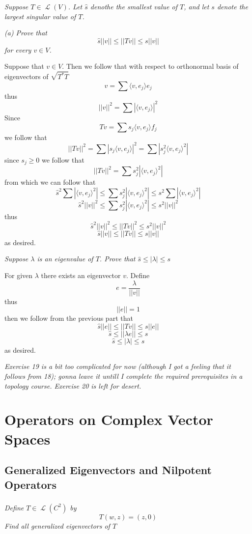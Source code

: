 \documentclass[11pt,oneside,titlepage]{book}
\DeclareMathOperator \map {\mathcal {L}}
\newcommand{\eangle}[1]{\langle #1 \rangle}
\begin{document}
\textit{Suppose $T \in \map(V)$. Let $\hat{s}$ denothe the smallest value of $T$, and let $s$
  denote the largest singular value of $T$.}

\textit{(a) Prove that
  $$\hat{s}||v|| \leq ||Tv|| \leq s||v||$$
  for every $v \in V$.}

Suppose that $v \in V$. Then we follow that with respect to orthonormal basis of eigenvectors
of $\sqrt{T^* T}$
$$v = \sum{\eangle{v, e_j} e_j}$$
thus
$$||v||^2 = \sum{|\eangle{v, e_j}|^2}$$
Since
$$Tv = \sum{s_j \eangle{v, e_j} f_j}$$
we follow that
$$||Tv||^2 = \sum{|s_j \eangle{v, e_j}|^2} = \sum{|s_j^2 \eangle{v, e_j}^2|}$$
since $s_j \geq 0$ we follow that
$$||Tv||^2 = \sum{s_j^2|\eangle{v, e_j}^2|}$$
from which we can follow that
$$\hat{s}^2\sum{|\eangle{v, e_j}^2|} \leq \sum{s_j^2|\eangle{v, e_j}^2|}
\leq s^2 \sum{|\eangle{v, e_j}^2|}$$
$$\hat{s}^2||v||^2 \leq \sum{s_j^2|\eangle{v, e_j}^2|}
\leq s^2 ||v||^2$$
thus
$$\hat{s}^2||v||^2 \leq ||Tv||^2 \leq s^2 ||v||^2$$
$$\hat{s}||v|| \leq ||Tv|| \leq s ||v||$$
as desired.

\textit{Suppose $\lambda$ is an eigenvalue of $T$. Prove that $\hat{s} \leq |\lambda| \leq s$}

For given $\lambda$ there exists an eigenvector $v$. Define
$$e = \frac{\lambda}{||v||}$$
thus
$$||e|| = 1$$
then we follow from the previous part that 
$$\hat{s}||e|| \leq ||Tv|| \leq s ||e||$$
$$\hat{s} \leq ||\lambda e|| \leq s$$
$$\hat{s} \leq |\lambda| \leq s$$
as desired.

\textit{Exercise 19 is a bit too complicated for now (although I got a feeling that it follows
  from 18); gonna leave it untill I complete the
required prerequisites in a topology course. Exercise 20 is left for desert.}


\chapter{Operators on Complex Vector Spaces}

\section{Generalized Eigenvectors and Nilpotent Operators}

\subsection{}

\textit{Define $T \in \map(C^2)$ by
  $$T(w, z) = (z, 0)$$
  Find all generalized eigenvectors of $T$}
\end{document}

